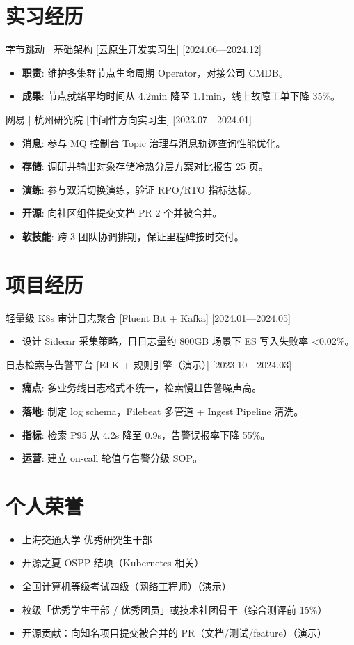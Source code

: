 \documentclass{resume-photo}
\begin{document}
\section{实习经历}
\ResumeItem
{字节跳动 | 基础架构}
[\textnormal{云原生开发实习生}]
[2024.06—2024.12]

\begin{itemize}
  \item \textbf{职责}: 维护多集群节点生命周期 Operator，对接公司 CMDB。
  \item \textbf{成果}: 节点就绪平均时间从 4.2min 降至 1.1min，线上故障工单下降 35\%。
\end{itemize}


\ResumeItem
{网易 | 杭州研究院}
[\textnormal{中间件方向实习生}]
[2023.07—2024.01]

\begin{itemize}
  \item \textbf{消息}: 参与 MQ 控制台 Topic 治理与消息轨迹查询性能优化。
  \item \textbf{存储}: 调研并输出对象存储冷热分层方案对比报告 25 页。
  \item \textbf{演练}: 参与双活切换演练，验证 RPO/RTO 指标达标。
  \item \textbf{开源}: 向社区组件提交文档 PR 2 个并被合并。
  \item \textbf{软技能}: 跨 3 团队协调排期，保证里程碑按时交付。
\end{itemize}



\section{项目经历}
\ResumeItem
{轻量级 K8s 审计日志聚合}
[\textnormal{Fluent Bit + Kafka}]
[2024.01—2024.05]

\begin{itemize}
  \item 设计 Sidecar 采集策略，日日志量约 800GB 场景下 ES 写入失败率 <0.02\%。
\end{itemize}


\ResumeItem
{日志检索与告警平台}
[\textnormal{ELK + 规则引擎（演示）}]
[2023.10—2024.03]

\begin{itemize}
  \item \textbf{痛点}: 多业务线日志格式不统一，检索慢且告警噪声高。
  \item \textbf{落地}: 制定 log schema，Filebeat 多管道 + Ingest Pipeline 清洗。
  \item \textbf{指标}: 检索 P95 从 4.2s 降至 0.9s，告警误报率下降 55\%。
  \item \textbf{运营}: 建立 on-call 轮值与告警分级 SOP。
\end{itemize}



\section{个人荣誉}
\begin{itemize}
  \item 上海交通大学 优秀研究生干部
  \item 开源之夏 OSPP 结项（Kubernetes 相关）
  \item 全国计算机等级考试四级（网络工程师）（演示）
  \item 校级「优秀学生干部 / 优秀团员」或技术社团骨干（综合测评前 15\%）
  \item 开源贡献：向知名项目提交被合并的 PR（文档/测试/feature）（演示）
\end{itemize}
\end{document}
